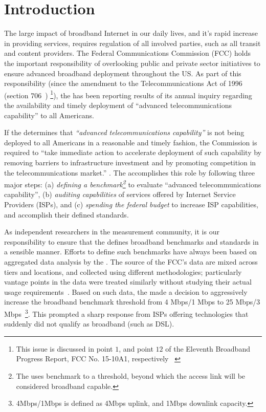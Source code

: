 \section{Introduction}
\label{sec:intro}

The large impact of broadband Internet in our daily lives, and it’s rapid increase in providing
services, requires regulation of all involved parties, such as all transit and content providers.
The Federal Communications Commission (FCC) holds the important responsibility of overlooking public
and private sector initiatives to ensure advanced broadband deployment throughout the US. As part of
this responsibility (since the amendment to the Telecommunications Act of 1996 (section 706~\cite{fcc1996telecom-act})
\footnote{This issue is discussed in point $1$, and point $12$ of the Eleventh Broadband Progress Report,
FCC No. 15-10A1, respectively ~\cite{fcc2015progress-report}\label{foot:fcc-issues}}), 
the \FCC has been reporting results of its annual inquiry regarding the
availability and timely deployment of ``advanced telecommunications capability'' to all Americans.


If the \FCC determines that \emph{``advanced telecommunications capability''} is not being deployed
to all Americans in a reasonable and timely fashion, the Commission is required to ``take immediate
action to accelerate deployment of such capability by removing barriers to infrastructure investment
and by promoting competition in the telecommunications market.'' .
The \FCC accomplishes this role by following three major steps:
(a) \emph{defining a benchmark\footnote{The \FCC uses benchmark to a 
threshold, beyond which the access link will be considered broadband capable.}} 
to evaluate ``advanced telecommunications capability'', (b) \emph{auditing
capabilities} of services offered by Internet Service Providers (ISPs), and (c) \emph{spending the
federal budget} to increase ISP capabilities, and accomplish their defined standards.

As independent researchers in the measurement community, it is our responsibility
to ensure that the
\FCC defines broadband benchmarks and standards in a sensible manner. Efforts to define such
benchmarks have always been based on aggregated data analysis by the \FCC. The 
source of the FCC's data are mixed across tiers and locations, and collected 
using different methodologies; particularly vantage points in the data were 
treated similarly without studying their actual usage 
requirements~\cite{fcc2015progress-report}. Based on such data, the \FCC made a 
decision to aggressively increase the broadband benchmark threshold from 4 
Mbps/1 Mbps to 25 Mbps/3 Mbps~\cite{fcc-redefine-ieee}\footnote{4Mbps/1Mbps is 
defined as 4Mbps uplink, and 1Mbps downlink capacity.}. This prompted a sharp 
response from ISPs offering technologies that suddenly did not qualify as 
broadband (such as DSL).

